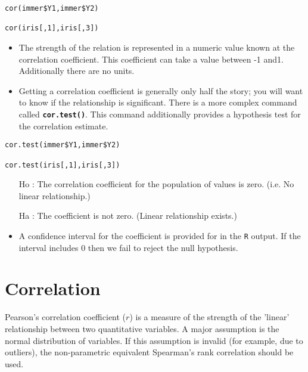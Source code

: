 \begin{framed}
\begin{verbatim}
cor(immer$Y1,immer$Y2)

cor(iris[,1],iris[,3])
\end{verbatim}
\end{framed}

\begin{itemize}

\item The strength of the relation is represented in a numeric value known at the correlation coefficient. This coefficient can take a value between -1 and1. Additionally there are no units.

\item Getting a correlation coefficient is generally only half the story; you will want to know if the relationship is significant. There is a more complex command called \texttt{\textbf{cor.test()}}. This command additionally provides a hypothesis test for the correlation estimate.
\end{itemize}
\begin{framed}
\begin{verbatim}
cor.test(immer$Y1,immer$Y2)

cor.test(iris[,1],iris[,3])
\end{verbatim}
\end{framed}

\begin{framed}
\begin{itemize}
\item[Ho] : The correlation coefficient for the population of values is zero. (i.e. No linear relationship.)
\item[Ha]: The coefficient is not zero. (Linear relationship exists.)
\end{itemize}	
\end{framed}

\begin{itemize}
\item A confidence interval for the coefficient is provided for in the \texttt{R} output. If the interval includes 0 then we fail to reject the null hypothesis.
\end{itemize}

\newpage

\section{Correlation}

Pearson's correlation coefficient ($r$) is a measure of the strength of the 'linear' relationship between two quantitative variables. A major assumption is the normal distribution of variables. If this assumption is invalid (for example, due to outliers), the non-parametric equivalent Spearman's rank correlation should be used.

